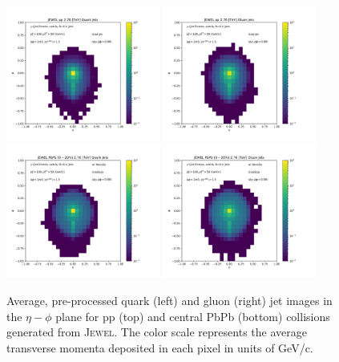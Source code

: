 \documentclass[notoc]{JHEP3}
\begin{document}
\begin{figure}[t]
\centering
\includegraphics[width=0.45\textwidth]{plots/JEWEL_pp_2p76TeV_AverageQuarkJet_Ypt100_jpt50.pdf}
\includegraphics[width=0.45\textwidth]{plots/JEWEL_pp_2p76TeV_AverageGluonJet_Ypt100_jpt50.pdf}
\includegraphics[width=0.45\textwidth]{plots/JEWEL_pbpb020_2p76TeV_AverageQuarkJet_Ypt100_jpt50.pdf}
\includegraphics[width=0.45\textwidth]{plots/JEWEL_pbpb020_2p76TeV_AverageGluonJet_Ypt100_jpt50.pdf}
\caption{Average, pre-processed quark (left) and gluon (right) jet images in the $\eta-\phi$ plane for pp (top) and central PbPb (bottom) collisions generated from \textsc{Jewel}. The color scale represents the average transverse momenta deposited in each pixel in units of GeV/c. }
\label{fig:qgjetimages}
\end{figure}
\end{document}

